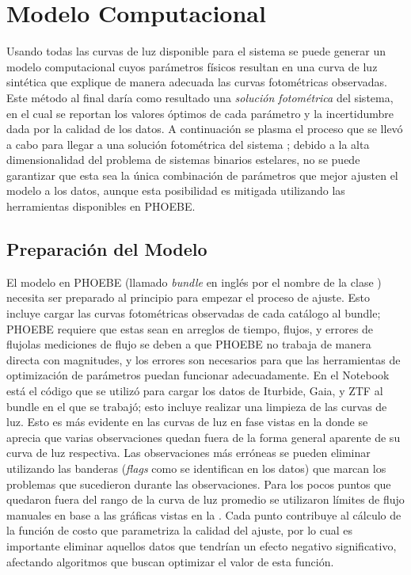 \chapter{Modelo Computacional} \label{metodologia:modelocomputacional}

Usando todas las curvas de luz disponible para el sistema \atoObjId se puede
generar un modelo computacional cuyos parámetros físicos resultan en una curva
de luz sintética que explique de manera adecuada las curvas fotométricas
observadas. Este método al final daría como resultado una \textit{solución
fotométrica} del sistema, en el cual se reportan los valores óptimos de cada
parámetro y la incertidumbre dada por la calidad de los datos. A continuación se
plasma el proceso que se llevó a cabo para llegar a una solución fotométrica del
sistema \atoObjIdNoSpace; debido a la alta dimensionalidad del problema de
sistemas binarios estelares, no se puede garantizar que esta sea la única
combinación de parámetros que mejor ajusten el modelo a los datos, aunque esta
posibilidad es mitigada utilizando las herramientas disponibles en PHOEBE.

\section{Preparación del Modelo}

El modelo en PHOEBE (llamado \textit{bundle} en inglés por el nombre de la clase
) necesita ser preparado al principio para empezar el
proceso de ajuste. Esto incluye cargar las curvas fotométricas observadas de
cada catálogo al bundle; PHOEBE requiere que estas sean en arreglos de tiempo,
flujos, y errores de flujo\textemdash las mediciones de flujo se deben a que
PHOEBE no trabaja de manera directa con magnitudes, y los errores son necesarios
para que las herramientas de optimización de parámetros puedan funcionar
adecuadamente. En el Notebook
\href{https://github.com/KnightIV/UANL_MAPTA_Observaciones/blob/main/analisis/phoebe_model/initial-model-prep.ipynb}{}
está el código que se utilizó para cargar los datos de Iturbide, Gaia, y ZTF al
bundle en el que se trabajó; esto incluye realizar una limpieza de las curvas de
luz. Esto es más evidente en las curvas de luz en fase vistas en la
 donde se aprecia que varias
observaciones quedan fuera de la forma general aparente de su curva de luz
respectiva. Las observaciones más erróneas se pueden eliminar utilizando las
banderas (\textit{flags} como se identifican en los datos) que marcan los
problemas que sucedieron durante las observaciones. Para los pocos puntos que
quedaron fuera del rango de la curva de luz promedio se utilizaron límites de
flujo manuales en base a las gráficas vistas en la
. Cada punto contribuye al cálculo de
la función de costo que parametriza la calidad del ajuste, por lo cual es
importante eliminar aquellos datos que tendrían un efecto negativo
significativo, afectando algoritmos que buscan optimizar el valor de esta
función.

